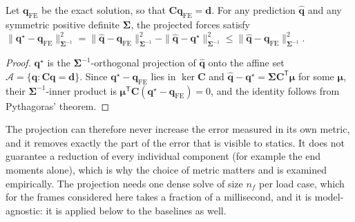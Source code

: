 \begin{proposition}\label{prop:projection}
Let $\mathbf{q}_\mathrm{FE}$ be the exact solution, so that $\mathbf{C}\mathbf{q}_\mathrm{FE}=\mathbf{d}$. For any prediction $\hat{\mathbf{q}}$ and any symmetric positive definite $\boldsymbol{\Sigma}$, the projected forces satisfy
$\|\mathbf{q}^\star-\mathbf{q}_\mathrm{FE}\|^2_{\boldsymbol{\Sigma}^{-1}} = \|\hat{\mathbf{q}}-\mathbf{q}_\mathrm{FE}\|^2_{\boldsymbol{\Sigma}^{-1}} - \|\hat{\mathbf{q}}-\mathbf{q}^\star\|^2_{\boldsymbol{\Sigma}^{-1}} \le \|\hat{\mathbf{q}}-\mathbf{q}_\mathrm{FE}\|^2_{\boldsymbol{\Sigma}^{-1}}$.
\end{proposition}
\begin{proof}
$\mathbf{q}^\star$ is the $\boldsymbol{\Sigma}^{-1}$-orthogonal projection of $\hat{\mathbf{q}}$ onto the affine set $\mathcal{A}=\{\mathbf{q}:\mathbf{C}\mathbf{q}=\mathbf{d}\}$. Since $\mathbf{q}^\star-\mathbf{q}_\mathrm{FE}$ lies in $\ker\mathbf{C}$ and $\hat{\mathbf{q}}-\mathbf{q}^\star=\boldsymbol{\Sigma}\mathbf{C}^{\mathsf T}\boldsymbol{\mu}$ for some $\boldsymbol{\mu}$, their $\boldsymbol{\Sigma}^{-1}$-inner product is $\boldsymbol{\mu}^{\mathsf T}\mathbf{C}(\mathbf{q}^\star-\mathbf{q}_\mathrm{FE})=0$, and the identity follows from Pythagoras' theorem.
\end{proof}
The projection can therefore never increase the error measured in its own metric, and it removes exactly the part of the error that is visible to statics. It does not guarantee a reduction of every individual component (for example the end moments alone), which is why the choice of metric matters and is examined empirically. The projection needs one dense solve of size $n_f$ per load case, which for the frames considered here takes a fraction of a millisecond, and it is model-agnostic: it is applied below to the baselines as well.

